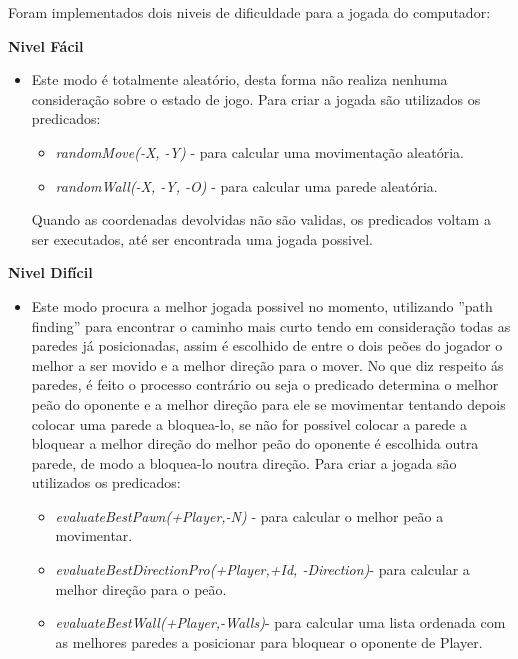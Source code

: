 \documentclass[a4paper]{article}
\begin{document}
Foram implementados dois niveis de dificuldade para a jogada do computador:

\textbf{Nivel Fácil}
\begin{itemize}
\item Este modo é totalmente aleatório, desta forma não realiza nenhuma consideração sobre o estado de jogo. Para criar a jogada são utilizados os predicados:
	\begin{itemize}
		\item \textit{randomMove(-X, -Y)} - para calcular uma movimentação aleatória.
		\item \textit{randomWall(-X, -Y, -O)} - para calcular uma parede aleatória.
	\end{itemize}
	 Quando as coordenadas devolvidas não são validas, os predicados voltam a ser executados, até ser encontrada uma jogada possivel.
\end{itemize}

\textbf{Nivel Difícil}
\begin{itemize}
\item Este modo procura a melhor jogada possivel no momento, utilizando ''path finding'' para encontrar o caminho mais curto tendo em consideração todas as paredes já posicionadas, assim é escolhido de entre o dois peões do jogador o melhor a ser movido e a melhor direção para o mover.
No que diz respeito ás paredes, é feito o processo contrário ou seja o predicado determina o melhor peão do oponente e a melhor direção para ele se movimentar tentando depois colocar uma parede a bloquea-lo, se não for possivel colocar a parede a bloquear a melhor direção do melhor peão do oponente é escolhida outra parede, de modo a bloquea-lo noutra direção.
 Para criar a jogada são utilizados os predicados:
 \begin{itemize}
		\item \textit{evaluateBestPawn(+Player,-N)} - para calcular o melhor peão a movimentar.
		\item \textit{evaluateBestDirectionPro(+Player,+Id, -Direction)}-  para calcular a melhor direção para o peão.
		\item \textit{evaluateBestWall(+Player,-Walls)}- para calcular uma lista ordenada com as melhores paredes a posicionar para bloquear o oponente de Player.
	\end{itemize}
\end{itemize}
\end{document}
